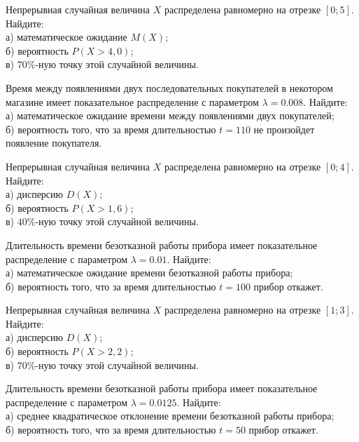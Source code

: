 \newpage\setcounter{zad}{0}

\z Непрерывная случайная величина $X$ распределена равномерно на отрезке $[0; 5]$. Найдите: \\ \quad а) математическое ожидание $M(X)$; \\ \quad б) вероятность $P(X>4{,}0)$; \\ \quad в) $70\%$-ную точку этой случайной величины.


\vfill

\z Время между появлениями двух последовательных покупателей в некотором магазине имеет показательное распределение с параметром $\lambda = 0.008$. Найдите: \\ \quad а) математическое ожидание времени между появлениями двух покупателей; \\ \quad б) вероятность того, что за время длительностью $t = 110$ не произойдет появление покупателя.
 

\vfill

\newpage\setcounter{zad}{0}

\z Непрерывная случайная величина $X$ распределена равномерно на отрезке $[0; 4]$. Найдите: \\ \quad а) дисперсию $D(X)$; \\ \quad б) вероятность $P(X>1{,}6)$; \\ \quad в) $40\%$-ную точку этой случайной величины.


\vfill

\z Длительность времени безотказной работы прибора имеет показательное распределение с параметром $\lambda = 0.01$. Найдите: \\ \quad а) математическое ожидание времени безотказной работы прибора; \\ \quad б) вероятность того, что за время длительностью $t = 100$ прибор  откажет.
 

\vfill

\newpage\setcounter{zad}{0}

\z Непрерывная случайная величина $X$ распределена равномерно на отрезке $[1; 3]$. Найдите: \\ \quad а) дисперсию $D(X)$; \\ \quad б) вероятность $P(X>2{,}2)$; \\ \quad в) $70\%$-ную точку этой случайной величины.


\vfill

\z Длительность времени безотказной работы прибора имеет показательное распределение с параметром $\lambda = 0.0125$. Найдите: \\ \quad а) среднее квадратическое отклонение времени безотказной работы прибора; \\ \quad б) вероятность того, что за время длительностью $t = 50$ прибор  откажет.
 

